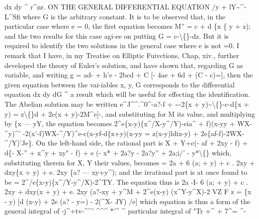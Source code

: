 \documentclass[11pt,a4paper]{book}
\begin{document}
dx
dy
\textasciicircum{}
r\textasciicircum{}nr.
ON THE GENERAL DIFFERENTIAL EQUATION
/y + lY\textasciitilde{}\textasciicircum{}-
L\textasciicircum{}Sfi
where G
is
the
arbitrary
constant.
It
is
to be
observed
that,
in
the
particular
case
where
e = 0, the
first equation becomes
M'' = c + d \{x \textbullet{}\{ y + z);
and the two results
for this case
agi-ee on putting G = c-\textbackslash\{\}-dz.
But
it
is
required
to
identify
the
two
solutions
in
the
general
case
where
e
is
not =0.
I remark that
I
have,
in my
Treatise on
Elliptic
Fuivctions, Chap,
xiv., further
developed
the
theory of
Euler's
solution, and
have shown
that, regarding G as
variable,
and writing
g = ad- + h'e - 2bcd + C [- 4ae + 6d + (C - c)=],
then
the
given
equation
between
the
vai-iables
x,
y, G
corresponds
to
the
differential
equation
dx
dy
dG
\textasciicircum{}
a
result
which
will
be
useful
for
effecting
the
identification.
The
Abelian
solution
may be written
e\textasciicircum{}J\textasciicircum{}\textasciicircum{}.\textasciicircum{}0\textasciicircum{}-a?-f + \textasciitilde{}-2\{x + y)\textasciitilde{}\textbackslash\{\}-c-d\{x + y) = z\textbackslash\{\}d + 2e(x + y)-2M\textasciicircum{}e]-,
and substituting
for M its
value, and multiplying by \{x --- yY, the equation becomes
2\textasciicircum{}e\{x-y)\{x\textasciicircum{}/X-y\textasciicircum{}/Y)-eia\textasciicircum{} + f)(x-yy + WX-\textasciicircum{}y)\textasciicircum{}'
-2(x'-f)WX-\textasciicircum{}/Y)\textasciicircum{}e-c(x-yf-d\{x+y)(x-yy
= z(x-y)ldix-y) + 2e\{af-f)-2WX-\textasciicircum{}/Y)'Je\}.
On the left-hand
side, the rational
part
is
X + Y+c(- af + 2xy - f) + d\{-
X-'' + x\textasciicircum{}y + xy" - f) + e (- x* + 2a?y - 2a?y'' + 2a;i/' - y*\textbackslash\{\}
which, substituting therein
for X, Y their
values, becomes
= 2a + 6 (a; + y) + c
. 2xy + dxy\{x + y) + e. 2xy \{a? --- xy+y\textasciicircum{});
and the
irrational part
is at once found
to be
= 2\textasciicircum{}/e\{x-y)\{x\textasciicircum{}/Y-y\textasciicircum{}/X)-2\textasciicircum{}TY.
The equation thus
is
2a -I- 6 (a; + y) + c
. 2xy + dxy(x + y) + e. 2xy (a?-xy + y\textasciicircum{}M
+ 2\textasciicircum{}e(x-y) (x\textasciicircum{}Y-y\textasciicircum{}X)-2 VZ F
z =
\{x - y) [d (x-y) + 2e (a? - y=) - 2(\textasciicircum{}X- JY) /e]
which
equation
is
thus
a
form
of
the
general
integral
of -j\textasciicircum{}+tv-\textasciicircum{}\textasciicircum{}'
\textasciicircum{}\textasciicircum{}\textasciicircum{}
*'\textregistered{}\textasciicircum{}
\textasciicircum{}
particular integral
of "Tr +\textasciicircum{} + 7\textasciicircum{}= \textasciicircum{}-
\end{document}
